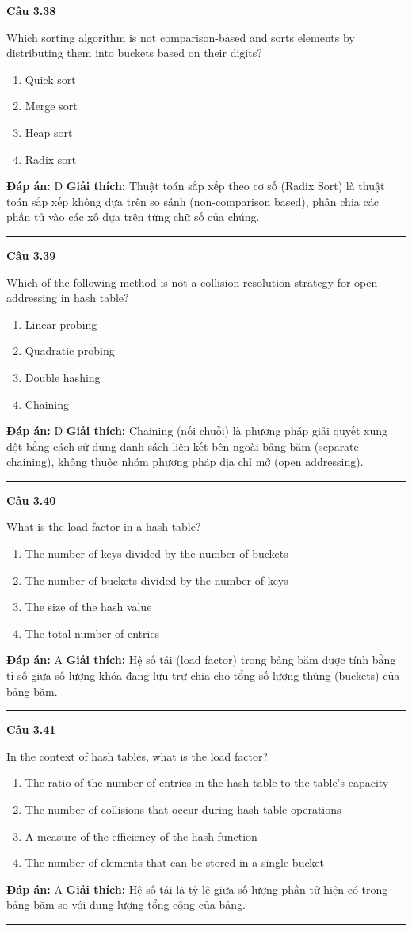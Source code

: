 \documentclass[11pt,a4paper]{article}
\newenvironment{question}[1]{%
  \par\vspace{1em}\noindent\textbf{\large Câu #1}\par\vspace{0.4em}
}{%
  \par\vspace{1em}\hrule\vspace{0.6em}
}
\newenvironment{choices}{%
  \begin{enumerate}[label=\textbf{\Alph*.},leftmargin=2.2em,itemsep=2pt,topsep=3pt]
}{%
  \end{enumerate}
}
\newcommand{\choice}{\item}
\begin{document}
\begin{question}{3.38}
Which sorting algorithm is not comparison-based and sorts elements by distributing them into buckets based on their digits?
\begin{choices}
\choice Quick sort
\choice Merge sort
\choice Heap sort
\choice Radix sort
\end{choices}
\textbf{Đáp án:} D
\textbf{Giải thích:} Thuật toán sắp xếp theo cơ số (Radix Sort) là thuật toán sắp xếp không dựa trên so sánh (non-comparison based), phân chia các phần tử vào các xô dựa trên từng chữ số của chúng.
\end{question}

\begin{question}{3.39}
Which of the following method is not a collision resolution strategy for open addressing in hash table?
\begin{choices}
\choice Linear probing
\choice Quadratic probing
\choice Double hashing
\choice Chaining
\end{choices}
\textbf{Đáp án:} D
\textbf{Giải thích:} Chaining (nối chuỗi) là phương pháp giải quyết xung đột bằng cách sử dụng danh sách liên kết bên ngoài bảng băm (separate chaining), không thuộc nhóm phương pháp địa chỉ mở (open addressing).
\end{question}

\begin{question}{3.40}
What is the load factor in a hash table?
\begin{choices}
\choice The number of keys divided by the number of buckets
\choice The number of buckets divided by the number of keys
\choice The size of the hash value
\choice The total number of entries
\end{choices}
\textbf{Đáp án:} A
\textbf{Giải thích:} Hệ số tải (load factor) trong bảng băm được tính bằng tỉ số giữa số lượng khóa đang lưu trữ chia cho tổng số lượng thùng (buckets) của bảng băm.
\end{question}

\begin{question}{3.41}
In the context of hash tables, what is the load factor?
\begin{choices}
\choice The ratio of the number of entries in the hash table to the table's capacity
\choice The number of collisions that occur during hash table operations
\choice A measure of the efficiency of the hash function
\choice The number of elements that can be stored in a single bucket
\end{choices}
\textbf{Đáp án:} A
\textbf{Giải thích:} Hệ số tải là tỷ lệ giữa số lượng phần tử hiện có trong bảng băm so với dung lượng tổng cộng của bảng.
\end{question}
\end{document}
